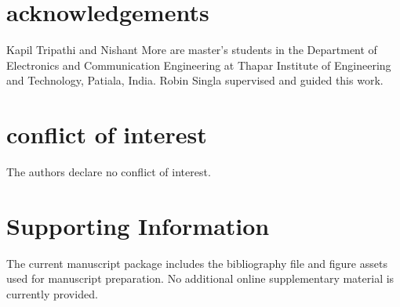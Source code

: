 \documentclass[num-refs]{wiley-article}
\begin{document}
    \section*{acknowledgements}

    Kapil Tripathi and Nishant More are master's students in the Department of Electronics and Communication Engineering at Thapar Institute of Engineering and Technology, Patiala, India. Robin Singla supervised and guided this work.


    \section*{conflict of interest}

    The authors declare no conflict of interest.


    \section*{Supporting Information}

    The current manuscript package includes the bibliography file and figure assets used for manuscript preparation. No additional online supplementary material is currently provided.


    \printendnotes


    

    
\end{document}
